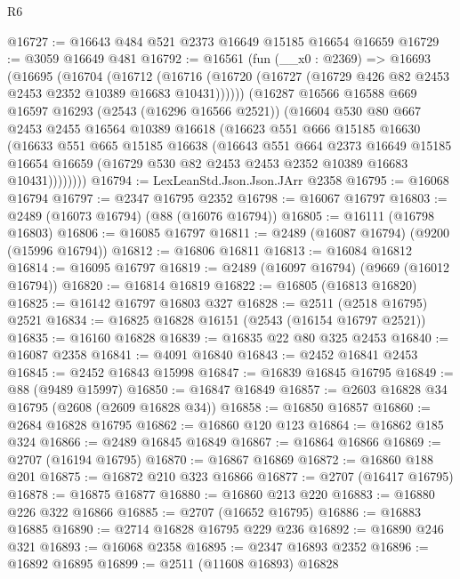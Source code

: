 \begin{lexlean}{R6}
\begin{coremodule}
@16727 := @16643 @484 @521 @2373 @16649 @15185 @16654 @16659
@16729 := @3059 @16649 @481
@16792 := @16561
    (fun (__x0 : @2369) =>
    @16693
      (@16695
        (@16704
          (@16712
            (@16716 (@16720 (@16727 (@16729 @426 @82 @2453 @2453 @2352 @10389 @16683 @10431))))))
        (@16287
          @16566
          @16588
          @669
          @16597
          @16293
          (@2543 (@16296 @16566 @2521))
          (@16604
            @530
            @80
            @667
            @2453
            @2455
            @16564
            @10389
            @16618
            (@16623
              @551
              @666
              @15185
              @16630
              (@16633
                @551
                @665
                @15185
                @16638
                (@16643
                  @551
                  @664
                  @2373
                  @16649
                  @15185
                  @16654
                  @16659
                  (@16729 @530 @82 @2453 @2453 @2352 @10389 @16683 @10431))))))))
@16794 := LexLeanStd.Json.Json.JArr @2358
@16795 := @16068 @16794
@16797 := @2347 @16795 @2352
@16798 := @16067 @16797
@16803 := @2489 (@16073 @16794) (@88 (@16076 @16794))
@16805 := @16111 (@16798 @16803)
@16806 := @16085 @16797
@16811 := @2489 (@16087 @16794) (@9200 (@15996 @16794))
@16812 := @16806 @16811
@16813 := @16084 @16812
@16814 := @16095 @16797
@16819 := @2489 (@16097 @16794) (@9669 (@16012 @16794))
@16820 := @16814 @16819
@16822 := @16805 (@16813 @16820)
@16825 := @16142 @16797 @16803 @327
@16828 := @2511 (@2518 @16795) @2521
@16834 := @16825 @16828 @16151 (@2543 (@16154 @16797 @2521))
@16835 := @16160 @16828
@16839 := @16835 @22 @80 @325 @2453
@16840 := @16087 @2358
@16841 := @4091 @16840
@16843 := @2452 @16841 @2453
@16845 := @2452 @16843 @15998
@16847 := @16839 @16845 @16795
@16849 := @88 (@9489 @15997)
@16850 := @16847 @16849
@16857 := @2603 @16828 @34 @16795 (@2608 (@2609 @16828 @34))
@16858 := @16850 @16857
@16860 := @2684 @16828 @16795
@16862 := @16860 @120 @123
@16864 := @16862 @185 @324
@16866 := @2489 @16845 @16849
@16867 := @16864 @16866
@16869 := @2707 (@16194 @16795)
@16870 := @16867 @16869
@16872 := @16860 @188 @201
@16875 := @16872 @210 @323 @16866
@16877 := @2707 (@16417 @16795)
@16878 := @16875 @16877
@16880 := @16860 @213 @220
@16883 := @16880 @226 @322 @16866
@16885 := @2707 (@16652 @16795)
@16886 := @16883 @16885
@16890 := @2714 @16828 @16795 @229 @236
@16892 := @16890 @246 @321
@16893 := @16068 @2358
@16895 := @2347 @16893 @2352
@16896 := @16892 @16895
@16899 := @2511 (@11608 @16893) @16828

\end{coremodule}
\end{lexlean}
